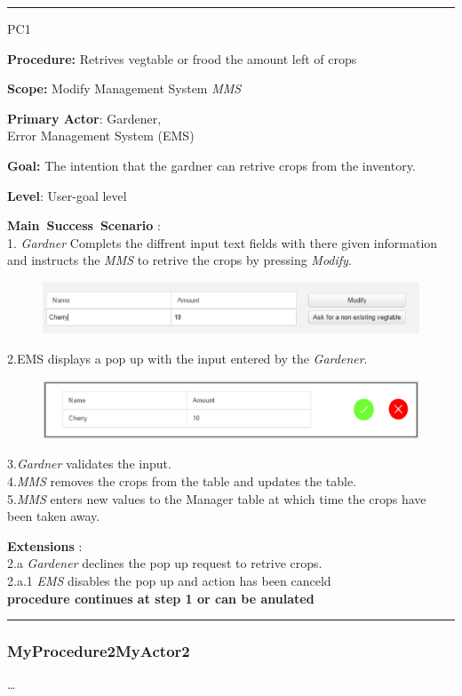 \vspace{0.5cm}
\hrule
\hfill \break
\begin{lyxlist}{PC1}
\small{
\item [\textbf{Procedure:}] Retrives vegtable or
frood the amount left of crops
\item [\textbf{Scope:}] Modify Management System \emph{MMS}
\item [\textbf{Primary Actor}:] Gardener,\\
Error Management System (EMS)
\item [\textbf{Goal:}] The intention that the gardner can retrive crops from
the inventory.
\item [\textbf{Level}:] User-goal level
\item [\textbf{Main~Success~Scenario}]:\\
1. \emph{Gardner} Complets the diffrent input text fields with there given
information and instructs the \emph{MMS} to retrive the crops by
pressing \emph{Modify}.\\

\begin{figure}
\includegraphics[width=1\textwidth]{images/RetriveCropsBase.eps}
\end{figure}

 2.{EMS} displays a pop up with the input entered by the \emph{Gardener}.\\
\begin{figure}
\includegraphics[width=1\textwidth]{images/PopUpRetrive.eps}
\end{figure}
3.\emph{Gardner} validates the input.\\
4.\emph{MMS} removes the crops from the table and updates the table.\\
5.\emph{MMS} enters new values to the Manager table at which time the crops
have been taken away.\\
\item [\textbf{Extensions}]:\\
2.a  \emph{Gardener} declines the pop up request to retrive crops.\\
\hspace*{0.5cm} 2.a.1 \emph{EMS}  disables the pop up and action has been
canceld\\
\hspace*{0.5cm} \textbf{procedure continues at step 1 or can be anulated}
\item 
}
\end{lyxlist}
\hrule
\vspace{0.5cm}


\break
\subsubsection{MyProcedure2MyActor2}
\ldots














